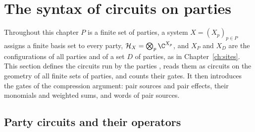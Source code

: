 \section{The syntax of circuits on parties}
\label{sec:party_syntax}

Throughout this chapter $P$ is a finite set of parties, a system
$X=(X_p)_{p\in P}$ assigns a finite basis set to every party,
$\mathcal H_X=\bigotimes_p\C^{X_p}$, and $X_P$ and $X_D$ are the configurations of
all parties and of a set $D$ of parties, as in Chapter~\ref{ch:sites}. This
section defines the circuits run by the parties
\cite[Section~5.1]{OpenAI2026PolynomialPEPS}, reads them as circuits on the
geometry of all finite sets of parties, and counts their gates. It then
introduces the gates of the compression argument: pair sources and pair effects,
their monomials and weighted sums, and words of pair sources.

\subsection{Party circuits and their operators}
\label{sec:party_syntax_circuits}

